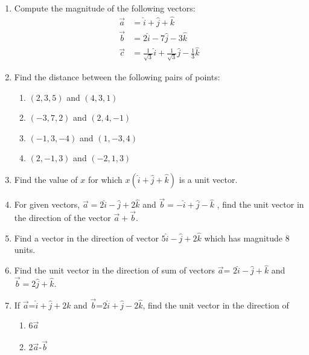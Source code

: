 \begin{enumerate}[label=\thesubsection.\arabic*,ref=\thesubsection.\theenumi]
\item Compute the magnitude of the following vectors:
\begin{align}
	\vec{a}&=\hat{i}+\hat{j}+\hat{k}
	\\
	\vec{b}&=2\hat{i}-7\hat{j}-3\hat{k}
	\\
	\vec{c}&=\frac{1}{\sqrt{3}}\hat{i}+\frac{1}{\sqrt{3}}\hat{j}-\frac{1}{3}\hat{k}
\end{align}
    \solution 
		
\item Find the distance between the following pairs of points:
\begin{enumerate}[label=(\roman*)]
\item $(2,3,5)$ and $(4,3,1)$
\item $(-3,7,2)$ and $(2,4,-1)$
\item $(-1,3,-4)$ and $(1,-3,4)$
\item $(2,-1,3)$ and $(-2,1,3)$
\end{enumerate}
\item Find the value of $x$ for which $x(\hat{i}+\hat{j}+\hat{k})$ is a unit vector.\\
	\solution
		
\item For given vectors, $\vec{a}=2\hat{i}-\hat{j}+2\hat{k}$ and $\vec{b}=-\hat{i}+\hat{j}-\hat{k}$ , find the unit vector in the
direction of the vector $\vec{a}+\vec{b}$.
        \label{prob:12/10/2/9}
\\
    \solution 
		
\item Find a vector in the direction of vector $5\hat{i}-\hat{j}+2\hat{k}$ which has magnitude 8 units.
        \label{prob:12/10/2/10const}
   \\ 
    \solution 
		
\item Find the unit vector in the direction of sum of vectors $\vec{a}$= $2\hat{i}-\hat{j}+\hat{k}$  and  $\vec{b}=2\hat{j}+\hat{k}$.
\item If $\vec{a}$=$\hat{i}+\hat{j}+2\hat{k}$  and  $\vec{b}$=$2\hat{i}+\hat{j}-2\hat{k}$, find the unit vector in the direction of
	\begin{enumerate}
		\item 6$\vec{a}$   
		\item 2$\vec{a}$-$\vec{b}$
	\end{enumerate}


\end{enumerate}
